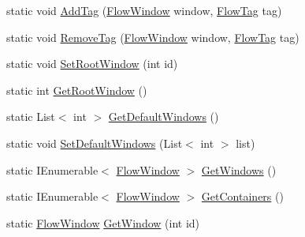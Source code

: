 \begin{DoxyCompactItemize}
\item 
static void \hyperlink{class_unity_engine_1_1_u_i_1_1_windows_1_1_plugins_1_1_flow_1_1_flow_system_a35516e93f10021036f90001852827c5b}{Add\+Tag} (\hyperlink{class_unity_engine_1_1_u_i_1_1_windows_1_1_plugins_1_1_flow_1_1_flow_window}{Flow\+Window} window, \hyperlink{class_unity_engine_1_1_u_i_1_1_windows_1_1_plugins_1_1_flow_1_1_flow_tag}{Flow\+Tag} tag)
\item 
static void \hyperlink{class_unity_engine_1_1_u_i_1_1_windows_1_1_plugins_1_1_flow_1_1_flow_system_adf70e09dc3ee10e7b002aac95fe179f8}{Remove\+Tag} (\hyperlink{class_unity_engine_1_1_u_i_1_1_windows_1_1_plugins_1_1_flow_1_1_flow_window}{Flow\+Window} window, \hyperlink{class_unity_engine_1_1_u_i_1_1_windows_1_1_plugins_1_1_flow_1_1_flow_tag}{Flow\+Tag} tag)
\item 
static void \hyperlink{class_unity_engine_1_1_u_i_1_1_windows_1_1_plugins_1_1_flow_1_1_flow_system_ac3b82325b7c739c3c55ce3914a7b0869}{Set\+Root\+Window} (int id)
\item 
static int \hyperlink{class_unity_engine_1_1_u_i_1_1_windows_1_1_plugins_1_1_flow_1_1_flow_system_a1b60c6a6ca7d4013128a740d7f321ebe}{Get\+Root\+Window} ()
\item 
static List$<$ int $>$ \hyperlink{class_unity_engine_1_1_u_i_1_1_windows_1_1_plugins_1_1_flow_1_1_flow_system_a8b11ed555963d22e491d53b509f954ec}{Get\+Default\+Windows} ()
\item 
static void \hyperlink{class_unity_engine_1_1_u_i_1_1_windows_1_1_plugins_1_1_flow_1_1_flow_system_a178d4ded07df975b3b8e2fc301743e14}{Set\+Default\+Windows} (List$<$ int $>$ list)
\item 
static I\+Enumerable$<$ \hyperlink{class_unity_engine_1_1_u_i_1_1_windows_1_1_plugins_1_1_flow_1_1_flow_window}{Flow\+Window} $>$ \hyperlink{class_unity_engine_1_1_u_i_1_1_windows_1_1_plugins_1_1_flow_1_1_flow_system_aefa40bb5348f886a5b41a2eb42cb0492}{Get\+Windows} ()
\item 
static I\+Enumerable$<$ \hyperlink{class_unity_engine_1_1_u_i_1_1_windows_1_1_plugins_1_1_flow_1_1_flow_window}{Flow\+Window} $>$ \hyperlink{class_unity_engine_1_1_u_i_1_1_windows_1_1_plugins_1_1_flow_1_1_flow_system_aac0b39f5f5606bba7f76e755ef4b82fb}{Get\+Containers} ()
\item 
static \hyperlink{class_unity_engine_1_1_u_i_1_1_windows_1_1_plugins_1_1_flow_1_1_flow_window}{Flow\+Window} \hyperlink{class_unity_engine_1_1_u_i_1_1_windows_1_1_plugins_1_1_flow_1_1_flow_system_a5dacc5b20d09de3aef611fda0122ed6a}{Get\+Window} (int id)

\end{DoxyCompactItemize}
